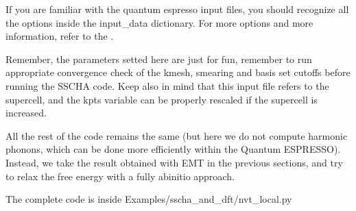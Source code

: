 \documentclass[a4paper,11pt,english]{sphinxmanual}
\begin{document}
\begin{sphinxVerbatim}[commandchars=\\\{\}]
  
  


  
                                       
                                       
\end{sphinxVerbatim}

\sphinxAtStartPar
If you are familiar with the quantum espresso input files, you should recognize all the options inside the input\_data dictionary. For more options and more information, refer to the .

\sphinxAtStartPar
Remember, the parameters setted here are just for fun, remember to run appropriate convergence check of the kmesh, smearing and basis set cutoffs before running the SSCHA code.
Keep also in mind that this input file refers to the supercell, and the kpts variable can be properly rescaled if the supercell is increased.

\sphinxAtStartPar
All the rest of the code remains the same (but here we do not compute harmonic phonons, which can be done more efficiently within the Quantum ESPRESSO).
Instead, we take the result obtained with EMT in the previous sections, and try to relax the free energy with a fully ab\sphinxhyphen{}initio approach.

\sphinxAtStartPar
The complete code is inside Examples/sscha\_and\_dft/nvt\_local.py
\end{document}
